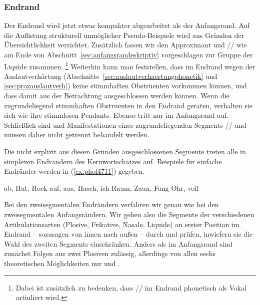 
\subsubsection{Endrand}

\label{sec:endranddeskriptiv}

Der Endrand wird jetzt etwas kompakter abgearbeitet als der Anfangsrand.
Auf die Auflistung strukturell unmöglicher Pseudo-Beispiele wird aus Gründen der Übersichtlichkeit verzichtet.
Zusätzlich fassen wir den Approximant und // wie am Ende von Abschnitt~\ref{sec:anfangsrandeskriptiv} vorgeschlagen zur Gruppe der Liquide zusammen.%
\footnote{Dabei ist zusätzlich zu bedenken, dass // im Endrand phonetisch als Vokal artiuliert wird.}
Weiterhin kann man feststellen, dass im Endrand wegen der Auslautverhärtung (Abschnitte~\ref{sec:auslautverhaertungphonetik} und \ref{sec:prozauslautverh}) keine stimmhaften Obstruenten vorkommen können, und dass damit \textipa{[b d g v z J]} aus der Betrachtung ausgeschlossen werden können.
Wenn die zugrundeliegend stimmhaften Obstruenten in den Endrand geraten, verhalten sie sich wie ihre stimmlosen Pendants. 
Ebenso tritt \textipa{[h]} nur im Anfangsrand auf.
Schließlich sind \textipa{[\c{c}]} und \textipa{[X]} Manifestationen eines zugrundeliegenden Segments // und müssen daher nicht getrennt behandelt werden.

Die nicht explizit aus diesen Gründen ausgeschlossenen Segmente treten alle in simplexen Endrändern des Kernwortschatzes auf.
Beispiele für einfache Endränder werden in (\ref{ex:phol4711}) gegeben.

\begin{exe}
  \ex\label{ex:phol4711}
  \begin{xlist}
  	\ex ab, Hut, Rock
  	\ex auf, aus, Hasch, ich
  	\ex Raum, Zaun, Fang
  	\ex Ohr, voll
  \end{xlist}
\end{exe}

Bei den zweisegmentalen Endrändern verfahren wir genau wie bei den zweisegmentalen Anfangsrändern.
Wir gehen also die Segmente der verschiedenen Artikulationsarten (Plosive, Frikative, Nasale, Liquide) an erster Position im Endrand -- sozusagen von innen nach außen -- durch und prüfen, inwiefern sie die Wahl des zweiten Segments einschränken.
Anders als im Anfangsrand sind zunächst Folgen aus zwei Plosiven zulässig, allerdings von allen sechs theoretischen Möglichkeiten nur \textipa{[pt]} und \textipa{[kt]}.

